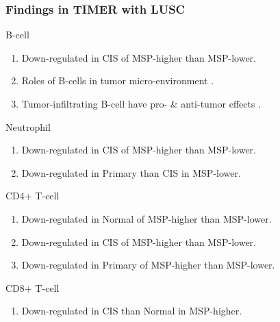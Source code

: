 \documentclass{beamer}
\begin{document}
    \begin{frame}[allowframebreaks]
        \frametitle{Findings in TIMER with LUSC}

        \begin{block}{B-cell}
            \begin{enumerate}
                \item Down-regulated in CIS of MSP-higher than MSP-lower.
                \item Roles of B-cells in tumor micro-environment \cite{Bcell-1}.
                \item Tumor-infiltrating B-cell have pro- \& anti-tumor effects \cite{Bcell-2}.
            \end{enumerate}
        \end{block}

         \begin{block}{Neutrophil}
            \begin{enumerate}
                \item Down-regulated in CIS of MSP-higher than MSP-lower.
                \item Down-regulated in Primary than CIS in MSP-lower.
            \end{enumerate}
        \end{block}

         \begin{block}{CD4+ T-cell}
            \begin{enumerate}
                \item Down-regulated in Normal of MSP-higher than MSP-lower.
                \item Down-regulated in CIS of MSP-higher than MSP-lower.
                \item Down-regulated in Primary of MSP-higher than MSP-lower.
            \end{enumerate}
        \end{block}

         \begin{block}{CD8+ T-cell}
            \begin{enumerate}
                \item Down-regulated in CIS than Normal in MSP-higher.
            \end{enumerate}
        \end{block}
    \end{frame}
\end{document}
